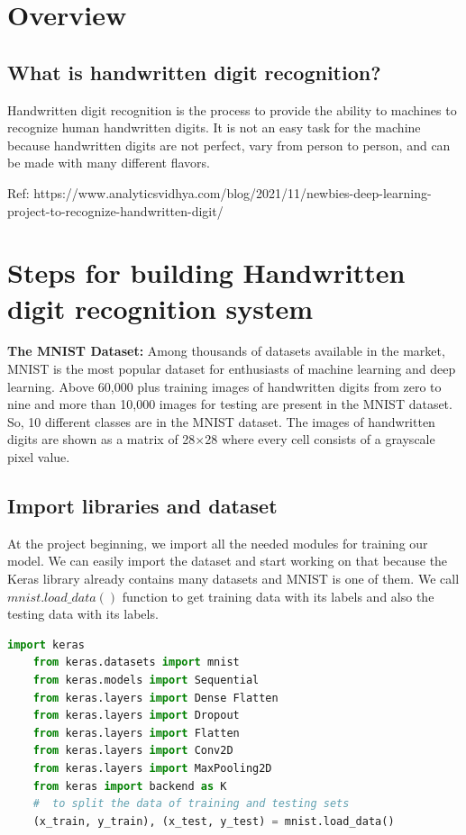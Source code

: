 \documentclass[conference]{IEEEtran}
\begin{document}
\section{Overview}

\subsection{What is handwritten digit recognition?}
Handwritten digit recognition is the process to provide the ability to machines to recognize human handwritten digits. It is not an easy task for the machine because handwritten digits are not perfect, vary from person to person, and can be made with many different flavors.

Ref: https://www.analyticsvidhya.com/blog/2021/11/newbies-deep-learning-project-to-recognize-handwritten-digit/

\section{Steps for building Handwritten digit recognition system}
\textbf{The MNIST Dataset:}
Among thousands of datasets available in the market, MNIST is the most popular dataset for enthusiasts of machine learning and deep learning. Above 60,000 plus training images of handwritten digits from zero to nine and more than 10,000 images for testing are present in the MNIST dataset. So, 10 different classes are in the MNIST dataset. The images of handwritten digits are shown as a matrix of 28×28 where every cell consists of a grayscale pixel value.

\subsection{Import libraries and dataset}\label{AA}
At the project beginning, we import all the needed modules for training our model.
We can easily import the dataset and start working on that because the Keras library already contains many datasets 
and MNIST is one of them. We call $mnist.load\_data()$
function to get training data with its labels and also the testing data with its labels.
\begin{lstlisting}[language=Python, caption=Import libraries and datasets]
    import keras
    from keras.datasets import mnist
    from keras.models import Sequential
    from keras.layers import Dense Flatten
    from keras.layers import Dropout
    from keras.layers import Flatten
    from keras.layers import Conv2D
    from keras.layers import MaxPooling2D
    from keras import backend as K
    #  to split the data of training and testing sets
    (x_train, y_train), (x_test, y_test) = mnist.load_data()
\end{lstlisting}
\end{document}
